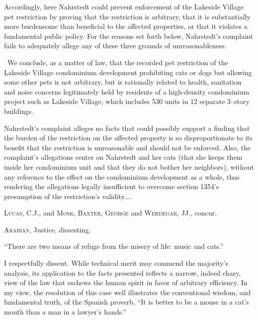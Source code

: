 Accordingly, here Nahrstedt could prevent enforcement of the Lakeside Village
pet restriction by proving that the restriction is arbitrary, that it is
substantially more burdensome than beneficial to the affected properties, or
that it violates a fundamental public policy. For the reasons set forth below,
Nahrstedt's complaint fails to adequately allege any of these three grounds of
unreasonableness.

~We conclude, as a matter of law, that the recorded pet restriction of the
Lakeside Village condominium development prohibiting cats or dogs but allowing
some other pets is not arbitrary, but is rationally related to health,
sanitation and noise concerns legitimately held by residents of a high-density
condominium project such as Lakeside Village, which includes 530 units in 12
separate 3--story buildings.

Nahrstedt's complaint alleges no facts that could possibly support a finding
that the burden of the restriction on the affected property is so
disproportionate to its benefit that the restriction is unreasonable and should
not be enforced. Also, the complaint's allegations center on Nahrstedt and her
cats (that she keeps them inside her condominium unit and that they do not
bother her neighbors), without any reference to the effect on the condominium
development as a whole, thus rendering the allegations legally insufficient to
overcome section 1354's presumption of the restriction's validity\ldots .

\textsc{Lucas}, C.J., and \textsc{Mosk, Baxter, George} and \textsc{Werdegar},
JJ., concur.

\opinion \textsc{Arabian}, Justice, dissenting.

``There are two means of refuge from the misery of life: music and
cats.''

I respectfully dissent. While technical merit may commend the majority's
analysis, its application to the facts presented reflects a narrow, indeed
chary, view of the law that eschews the human spirit in favor of arbitrary
efficiency. In my view, the resolution of this case well illustrates the
conventional wisdom, and fundamental truth, of the Spanish proverb, ``It is
better to be a mouse in a cat's mouth than a man in a lawyer's hands.''

